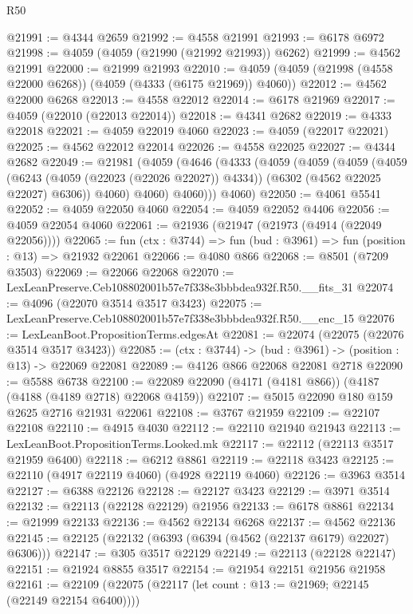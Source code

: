 \begin{lexlean}{R50}
\begin{coremodule}
@21991 := @4344 @2659
@21992 := @4558 @21991
@21993 := @6178 @6972
@21998 := @4059 (@4059 (@21990 (@21992 @21993)) @6262)
@21999 := @4562 @21991
@22000 := @21999 @21993
@22010 := @4059 (@4059 (@21998 (@4558 @22000 @6268)) (@4059 (@4333 (@6175 @21969)) @4060))
@22012 := @4562 @22000 @6268
@22013 := @4558 @22012
@22014 := @6178 @21969
@22017 := @4059 (@22010 (@22013 @22014))
@22018 := @4341 @2682
@22019 := @4333 @22018
@22021 := @4059 @22019 @4060
@22023 := @4059 (@22017 @22021)
@22025 := @4562 @22012 @22014
@22026 := @4558 @22025
@22027 := @4344 @2682
@22049 := @21981
    (@4059
      (@4646
        (@4333
          (@4059
            (@4059
              (@4059
                (@4059
                  (@6243 (@4059 (@22023 (@22026 @22027)) @4334))
                  (@6302 (@4562 @22025 @22027) @6306))
                @4060)
              @4060)
            @4060)))
      @4060)
@22050 := @4061 @5541
@22052 := @4059 @22050 @4060
@22054 := @4059 @22052 @4406
@22056 := @4059 @22054 @4060
@22061 := @21936 (@21947 (@21973 (@4914 (@22049 @22056))))
@22065 := fun (ctx : @3744) => fun (bud : @3961) => fun (position : @13) => @21932 @22061
@22066 := @4080 @866
@22068 := @8501 (@7209 @3503)
@22069 := @22066 @22068
@22070 := LexLeanPreserve.Ceb108802001b57e7f338e3bbbdea932f.R50.__fits_31
@22074 := @4096 (@22070 @3514 @3517 @3423)
@22075 := LexLeanPreserve.Ceb108802001b57e7f338e3bbbdea932f.R50.__enc_15
@22076 := LexLeanBoot.PropositionTerms.edgesAt
@22081 := @22074 (@22075 (@22076 @3514 @3517 @3423))
@22085 := (ctx : @3744) -> (bud : @3961) -> (position : @13) -> @22069 @22081
@22089 := @4126 @866 @22068 @22081 @2718
@22090 := @5588 @6738
@22100 := @22089 @22090 (@4171 (@4181 @866)) (@4187 (@4188 (@4189 @2718) @22068 @4159))
@22107 := @5015 @22090 @180 @159 @2625 @2716 @21931 @22061
@22108 := @3767 @21959
@22109 := @22107 @22108
@22110 := @4915 @4030
@22112 := @22110 @21940 @21943
@22113 := LexLeanBoot.PropositionTerms.Looked.mk
@22117 := @22112 (@22113 @3517 @21959 @6400)
@22118 := @6212 @8861
@22119 := @22118 @3423
@22125 := @22110 (@4917 @22119 @4060) (@4928 @22119 @4060)
@22126 := @3963 @3514
@22127 := @6388 @22126
@22128 := @22127 @3423
@22129 := @3971 @3514
@22132 := @22113 (@22128 @22129) @21956
@22133 := @6178 @8861
@22134 := @21999 @22133
@22136 := @4562 @22134 @6268
@22137 := @4562 @22136
@22145 := @22125 (@22132 (@6393 (@6394 (@4562 (@22137 @6179) @22027) @6306)))
@22147 := @305 @3517 @22129
@22149 := @22113 (@22128 @22147)
@22151 := @21924 @8855 @3517
@22154 := @21954 @22151 @21956 @21958
@22161 := @22109 (@22075 (@22117 (let count : @13 := @21969; @22145 (@22149 @22154 @6400))))

\end{coremodule}
\end{lexlean}
